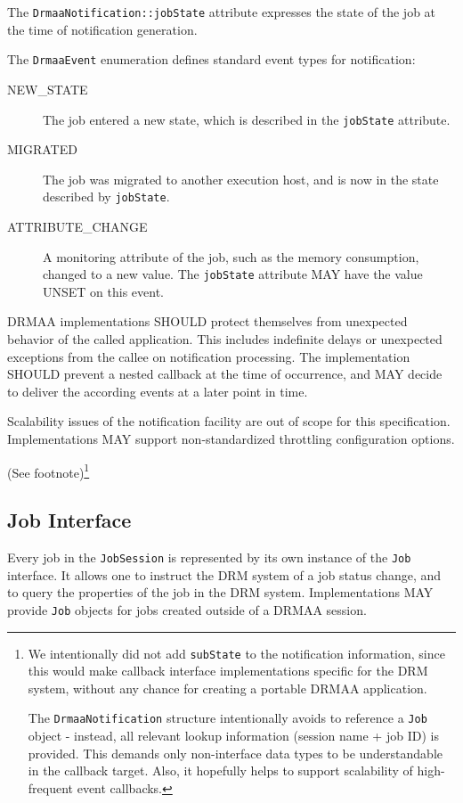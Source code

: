\documentclass{article}
\newcommand{\h}[1]{\lstinline|#1|}
\newcommand{\rat}[1]{ {\tiny(See footnote)}\footnote{#1} }
\begin{document}
The \h{DrmaaNotification::jobState} attribute expresses the state of the job at the time of notification generation. 

The \h{DrmaaEvent} enumeration defines standard event types for notification:

\begin{description}
	\item[NEW\_STATE] The job entered a new state, which is described in the \h{jobState} attribute. 
	\item[MIGRATED] The job was migrated to another execution host, and is now in the state described by \h{jobState}.
	\item[ATTRIBUTE\_CHANGE] A monitoring attribute of the job, such as the memory consumption, changed to a new value. The \h{jobState} attribute MAY have the value UNSET on this event.
\end{description}

DRMAA implementations SHOULD protect themselves from unexpected behavior of the called application. This includes indefinite delays or unexpected exceptions from the callee on notification processing. The implementation SHOULD prevent a nested callback at the time of occurrence, and MAY decide to deliver the according events at a later point in time. 

Scalability issues of the notification facility are out of scope for this specification. Implementations MAY support non-standardized throttling configuration options.

\rat{
We intentionally did not add \h{subState} to the notification information, since this would make callback interface implementations specific for the DRM system, without any chance for creating a portable DRMAA application. 

The \h{DrmaaNotification} structure intentionally avoids to reference a \h{Job} object - instead, all relevant lookup information (session name + job ID) is provided. This demands only non-interface data types to be understandable in the callback target. Also, it hopefully helps to support scalability of high-frequent event callbacks.
}


\subsection{Job Interface}
\label{sec:job}

Every job in the \h{JobSession} is represented by its own instance of the \h{Job} interface. It allows one to instruct the DRM system of a job status change, and to query the properties of the job in the DRM system. Implementations MAY provide \h{Job} objects for jobs created outside of a DRMAA session.
\end{document}
